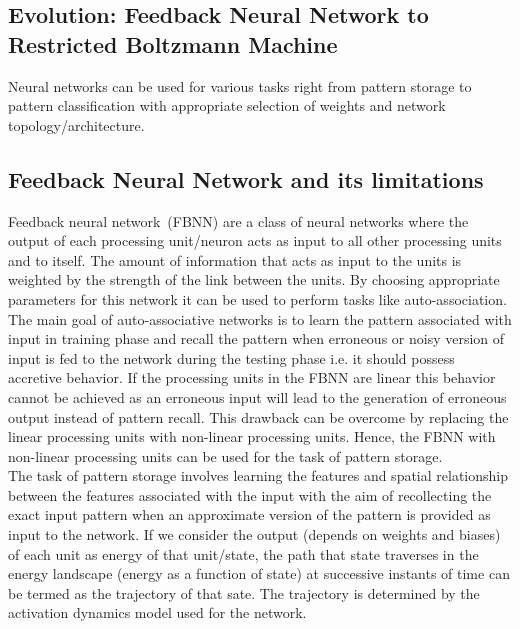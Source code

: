 \begin{spacing}{1.5}
\section{Evolution: Feedback Neural Network to Restricted Boltzmann Machine}
Neural networks can be used for various tasks right from pattern storage to pattern classification with appropriate selection of weights and network topology/architecture. \\
\subsection{Feedback Neural Network and its limitations}
Feedback neural network~(FBNN) are a class of neural networks where the output of each processing unit/neuron acts as input to all other processing units and to itself. The amount of information that acts as input to the units is weighted by the strength of the link between the units. By choosing appropriate parameters for this network it can be used to perform tasks like auto-association. \\
The main goal of auto-associative networks is to learn the pattern associated with input in training phase and recall the pattern when erroneous or noisy version of input is fed to the network during the testing phase i.e. it should possess accretive behavior. If the processing units in the FBNN are linear this behavior cannot be achieved as an erroneous input will lead to the generation of erroneous output instead of pattern recall. This drawback can be overcome by replacing the linear processing units with non-linear processing units. Hence, the FBNN with non-linear processing units can be used for the task of pattern storage.  \\
The task of pattern storage involves learning the features and spatial relationship between the features associated with the input with the aim of recollecting the exact input pattern when an approximate version of the pattern is provided as input to the network. 
If we consider the output (depends on weights and biases) of each unit as energy of that unit/state, the path that state traverses in the energy landscape (energy as a function of state)  at successive instants of time can be termed as the trajectory of that sate.  The trajectory is determined by the activation dynamics model used for the network. \\

\end{spacing}
